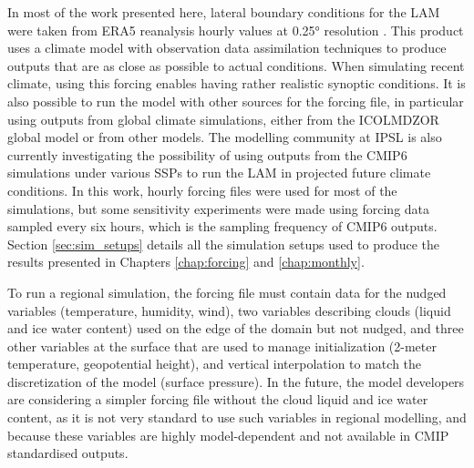 In most of the work presented here, lateral boundary conditions for the LAM were taken from ERA5 reanalysis hourly values at 0.25° resolution \citep{hersbach_era5_2020}. This product uses a climate model with observation data assimilation techniques to produce outputs that are as close as possible to actual conditions. When simulating recent climate, using this forcing enables having rather realistic synoptic conditions. 
It is also possible to run the model with other sources for the forcing file, in particular using outputs from global climate simulations, either from the ICOLMDZOR global model or from other models. The modelling community at IPSL is also currently investigating the possibility of using outputs from the CMIP6 simulations under various SSPs to run the LAM in projected future climate conditions.
In this work, hourly forcing files were used for most of the simulations, but some sensitivity experiments were made using forcing data sampled every six hours, which is the sampling frequency of CMIP6 outputs. Section \ref{sec:sim_setups} details all the simulation setups used to produce the results presented in Chapters \ref{chap:forcing} and \ref{chap:monthly}.

To run a regional simulation, the forcing file must contain data for the nudged variables (temperature, humidity, wind), two variables describing clouds (liquid and ice water content) used on the edge of the domain but not nudged, and three other variables at the surface that are used to manage initialization (2-meter temperature, geopotential height), and vertical interpolation to match the discretization of the model (surface pressure). In the future, the model developers are considering a simpler forcing file without the cloud liquid and ice water content, as it is not very standard to use such variables in regional modelling, and because these variables are highly model-dependent and not available in CMIP standardised outputs. 


